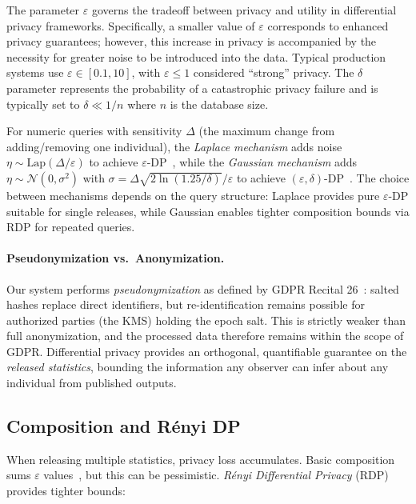 \documentclass[sigconf,anonymous,review]{acmart}
\begin{document}
The parameter $\varepsilon$ governs the tradeoff between privacy and utility in differential privacy frameworks. Specifically, a smaller value of $\varepsilon$ corresponds to enhanced privacy guarantees; however, this increase in privacy is accompanied by the necessity for greater noise to be introduced into the data. Typical production systems use $\varepsilon \in [0.1, 10]$, with $\varepsilon \leq 1$ considered ``strong'' privacy. The $\delta$ parameter represents the probability of a catastrophic privacy failure and is typically set to $\delta \ll 1/n$ where $n$ is the database size.

For numeric queries with sensitivity $\Delta$ (the maximum change from adding/removing one individual), the \emph{Laplace mechanism} adds noise $\eta \sim \text{Lap}(\Delta/\varepsilon)$ to achieve $\varepsilon$-DP~\cite{Dwork2006}, while the \emph{Gaussian mechanism} adds $\eta \sim \mathcal{N}(0, \sigma^2)$ with $\sigma = \Delta\sqrt{2\ln(1.25/\delta)}/\varepsilon$ to achieve $(\varepsilon, \delta)$-DP~\cite{Dwork2014, Dong2022}. The choice between mechanisms depends on the query structure: Laplace provides pure $\varepsilon$-DP suitable for single releases, while Gaussian enables tighter composition bounds via RDP for repeated queries.

\paragraph{Pseudonymization vs.\ Anonymization.} Our system performs \emph{pseudonymization} as defined by GDPR Recital 26~\cite{GDPR}: salted hashes replace direct identifiers, but re-identification remains possible for authorized parties (the KMS) holding the epoch salt. This is strictly weaker than full anonymization, and the processed data therefore remains within the scope of GDPR. Differential privacy provides an orthogonal, quantifiable guarantee on the \emph{released statistics}, bounding the information any observer can infer about any individual from published outputs.

\subsection{Composition and Rényi DP}

When releasing multiple statistics, privacy loss accumulates. Basic composition sums $\varepsilon$ values~\cite{Kairouz2015}, but this can be pessimistic. \emph{Rényi Differential Privacy} (RDP)~\cite{Mironov2017} provides tighter bounds:
\end{document}

